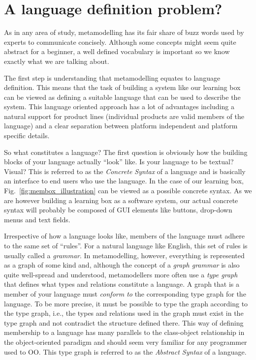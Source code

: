 
\section{A language definition problem?}

As in any area of study, metamodelling has its fair share of buzz words used by experts to communicate concisely.  Although some concepts might seem quite abstract for a beginner, a well defined vocabulary is important so we know
exactly what we are talking about.

The first step is understanding that metamodelling equates to language definition.
This means that the task of building a system like our learning box can be viewed as defining a suitable language that can be used to describe the system.
This language oriented approach has a lot of advantages including a natural support for product lines (individual products are valid members of the language) and a clear separation between platform independent and platform specific details.

So what constitutes a language?  The first question is obviously  how the building blocks of your language actually ``look'' like.
Is your language to be textual?  Visual?  This is referred to as the %
\emph{Concrete Syntax} 
of a language and is basically an interface to end users who use the language.
In the case of our learning box, Fig.~\ref{fig:membox_illustration} can be viewed as a possible concrete syntax.
As we are however building a learning box as a software system, our actual concrete syntax  will probably be composed of GUI elements like buttons, drop-down menus and text fields.

Irrespective of how a language looks like, members of the language must adhere to the same set of ``rules''.
For a natural language like English, this set of rules is usually called a \emph{grammar}.
In metamodelling, however, everything is represented as a graph of some kind and, although the concept of a  \emph{graph grammar} is also quite well-spread and understood, metamodellers  more often use a \emph{type graph} that defines what types and relations  constitute a language.
A graph that is a member of your language must \emph{conform to} the corresponding type graph for the language.
To be more precise, it must be possible to type the graph according to the type graph, i.e., the types and relations used in the graph must exist in the type graph and not contradict the structure defined there.
This way of defining membership to a language has many parallels to the class-object relationship in the object-oriented paradigm and should seem very familiar for any programmer used to OO.
This type graph is referred to as the \emph{Abstract Syntax} of a language.

